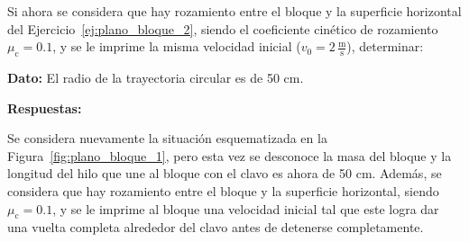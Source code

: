 \documentclass[addpoints]{exam}
\newcommand{\rtas}{\textbf{Respuestas: }}
\begin{document}
\begin{questions}
\begin{solution}
    \end{solution}

    \question Si ahora se considera que hay rozamiento entre el bloque y la superficie horizontal del Ejercicio~\ref{ej:plano_bloque_2}, siendo el coeficiente cinético de rozamiento $\mu_\text{c} = 0.1$, y se le imprime la misma velocidad inicial ($v_0 = 2 \, \frac{\text{m}}{\text{s}}$), determinar:

    \textbf{Dato:} El radio de la trayectoria circular es de 50 cm.

    \rtas

    \question Se considera nuevamente la situación esquematizada en la Figura~\ref{fig:plano_bloque_1}, pero esta vez se desconoce la masa del bloque y la longitud del hilo que une al bloque con el clavo es ahora de 50 cm. Además, se considera que hay rozamiento entre el bloque y la superficie horizontal, siendo $\mu_\text{c} = 0.1$, y se le imprime al bloque una velocidad inicial tal que este logra dar una vuelta completa alrededor del clavo antes de detenerse completamente.
    \begin{parts}

\end{parts}
\end{questions}
\end{document}
